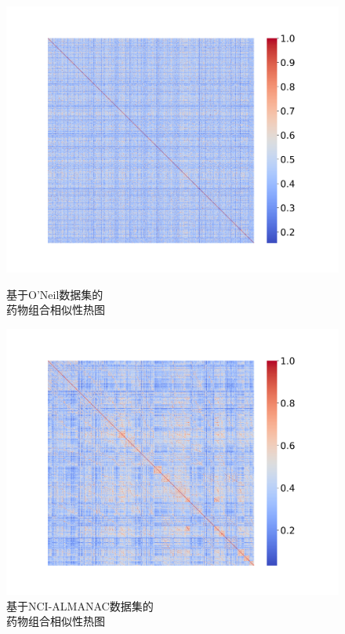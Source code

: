 \newpage

\begin{figure}[H]
\centering
  \begin{minipage}{0.45\linewidth}
    \centering
    \includegraphics[width=\textwidth]{figures/heatmap_m}
    \caption{基于O'Neil数据集的\\药物组合相似性热图\label{fig:mht}}
  \end{minipage}
  \begin{minipage}{0.45\linewidth}
    \centering
    \includegraphics[width=\textwidth]{figures/heatmap_n}
    \caption{基于NCI-ALMANAC数据集的\\药物组合相似性热图\label{fig:nht}}
  \end{minipage}
\end{figure}

